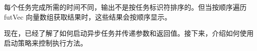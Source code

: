 每个任务完成所需的时间不同，输出不是按任务标识符排序的。但当按顺序遍历 futVec 向量数组获取结果时，这些结果会按顺序显示。

现在，已经了解了如何启动异步任务并传递参数和返回值。接下来，介绍如何使用启动策略来控制执行方法。




























